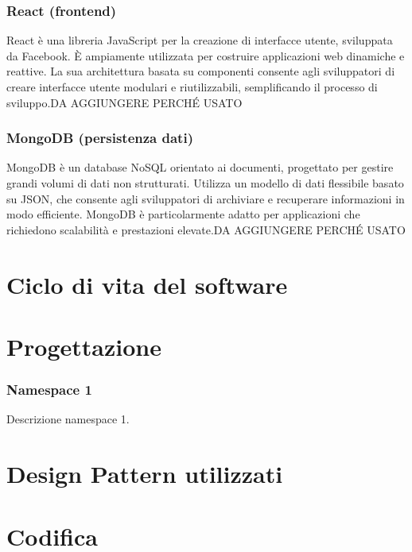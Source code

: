 \subsubsection*{React (frontend)}
React è una libreria JavaScript per la creazione di interfacce utente, sviluppata da Facebook. È ampiamente utilizzata per costruire applicazioni web dinamiche e reattive. La sua architettura basata su componenti consente agli sviluppatori di creare interfacce utente modulari e riutilizzabili, semplificando il processo di sviluppo.DA AGGIUNGERE PERCHÉ USATO

\subsubsection*{MongoDB (persistenza dati)}
MongoDB è un database NoSQL orientato ai documenti, progettato per gestire grandi volumi di dati non strutturati. Utilizza un modello di dati flessibile basato su JSON, che consente agli sviluppatori di archiviare e recuperare informazioni in modo efficiente. MongoDB è particolarmente adatto per applicazioni che richiedono scalabilità e prestazioni elevate.DA AGGIUNGERE PERCHÉ USATO

\section{Ciclo di vita del software}
\label{sec:ciclo-vita-software}

\section{Progettazione}
\label{sec:progettazione}

\subsubsection{Namespace 1} %
Descrizione namespace 1.

\begin{namespacedesc}
\end{namespacedesc}


\section{Design Pattern utilizzati}

\section{Codifica}
